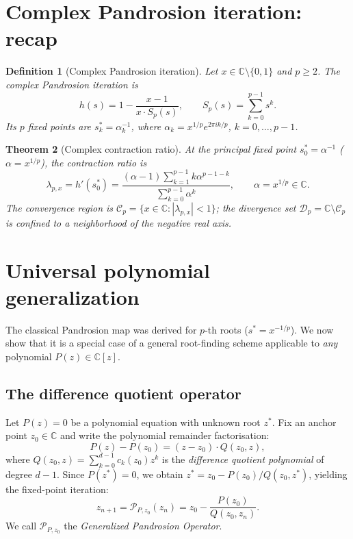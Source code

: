 \documentclass[11pt,a4paper]{article}
\newtheorem{theorem}{Theorem}[section]
\newtheorem{definition}[theorem]{Definition}
\begin{document}
\section{Complex Pandrosion iteration: recap}

\begin{definition}[Complex Pandrosion iteration]
Let $x \in \mathbb{C} \setminus \{0, 1\}$ and $p \ge 2$. The complex Pandrosion iteration is
\begin{equation}
h(s) = 1 - \frac{x - 1}{x \cdot S_p(s)}, \qquad S_p(s) = \sum_{k=0}^{p-1} s^k.
\end{equation}
Its $p$ fixed points are $s_k^* = \alpha_k^{-1}$, where $\alpha_k = x^{1/p} e^{2\pi i k/p}$, $k = 0, \dots, p-1$.
\end{definition}

\begin{theorem}[Complex contraction ratio]
At the principal fixed point $s_0^* = \alpha^{-1}$ ($\alpha = x^{1/p}$), the contraction ratio is
\begin{equation}
\lambda_{p,x} = h'(s_0^*) = \frac{(\alpha - 1)\sum_{k=1}^{p-1} k \alpha^{p-1-k}}{\sum_{k=0}^{p-1} \alpha^k}, \qquad \alpha = x^{1/p} \in \mathbb{C}.
\end{equation}
The convergence region is $\mathcal{C}_p = \{x \in \mathbb{C}: |\lambda_{p,x}| < 1\}$; the divergence set $\mathcal{D}_p = \mathbb{C} \setminus \mathcal{C}_p$ is confined to a neighborhood of the negative real axis.
\end{theorem}

\section{Universal polynomial generalization}

The classical Pandrosion map was derived for $p$-th roots ($s^* = x^{-1/p}$). We now show that it is a special case of a general root-finding scheme applicable to \emph{any} polynomial $P(z) \in \mathbb{C}[z]$.

\subsection{The difference quotient operator}

Let $P(z) = 0$ be a polynomial equation with unknown root $z^*$. Fix an anchor point $z_0 \in \mathbb{C}$ and write the polynomial remainder factorisation:
\begin{equation}
P(z) - P(z_0) = (z - z_0) \cdot Q(z_0, z),
\end{equation}
where $Q(z_0, z) = \sum_{k=0}^{d-1} c_k(z_0) z^k$ is the \emph{difference quotient polynomial} of degree $d - 1$. Since $P(z^*) = 0$, we obtain $z^* = z_0 - P(z_0)/Q(z_0, z^*)$, yielding the fixed-point iteration:
\begin{equation}
\boxed{z_{n+1} = \mathcal{P}_{P, z_0}(z_n) = z_0 - \frac{P(z_0)}{Q(z_0, z_n)}.}
\end{equation}
We call $\mathcal{P}_{P, z_0}$ the \emph{Generalized Pandrosion Operator}.
\end{document}
